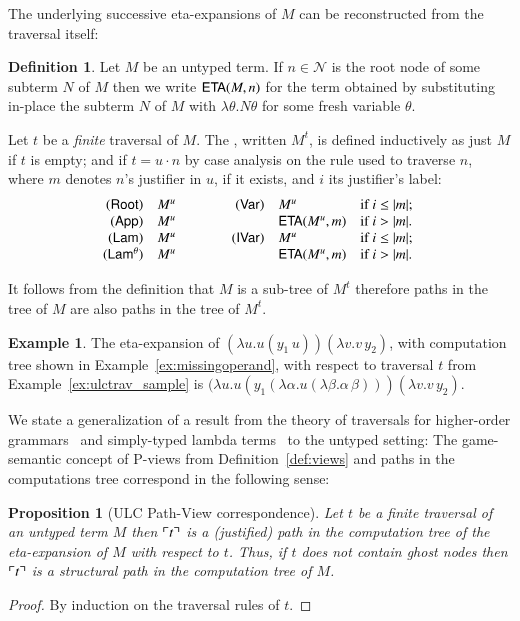 \documentclass{elsarticle}
\theoremstyle{plain}
\newtheorem{proposition}[theorem]{Proposition}
\theoremstyle{definition}
\newtheorem{definition}{Definition}[section]
\newtheorem{example}{Example}[section]
\theoremstyle{remark}
\newcommand\Nodes{\mathcal{N}}%
\newcommand{\ghostvar}{\theta}
\begin{document}
The underlying successive eta-expansions of $M$ can be reconstructed from the traversal itself:
\begin{definition}
\label{def:onthefly_etaexpansion}
Let $M$ be an untyped term. If $n\in \Nodes$ is the root node of some subterm $N$ of $M$ then we write ${\sf ETA}(M, n)$ for the term obtained by substituting in-place the subterm $N$ of $M$ with $\lambda\theta. N \theta$ for some fresh variable $\theta$.

Let $t$ be a \emph{finite} traversal of $M$. The , written $M^t$, is defined inductively as just $M$ if $t$ is empty; and if $t = u \cdot n$ by case analysis on the rule used to traverse $n$, where $m$ denotes $n$'s justifier in $u$, if it exists, and $i$ its justifier's label:
$$
\begin{array}{rlcrll}
    \rulename{Root}          & M^{u}  &\qquad & \rulename{Var}  & M^{u} \hfill &\mbox{if $i \leq |m|$; } \\
    \rulename{App}           & M^{u}  &       &                 & {\sf ETA}(M^{u}, m) \hfill  &\mbox{if $i > |m|$. } \\
    \rulename{Lam}           & M^{u}  &       & \rulename{IVar} & M^{u} \hfill &\mbox{if $i \leq |m|$; } \\
    \rulename{Lam^\ghostvar} & M^{u}  &       &                 & {\sf ETA}(M^{u}, m)  \hfill &\mbox{if $i > |m|$.}
\end{array}
$$
\end{definition}
It follows from the definition that $M$ is a sub-tree of $M^t$ therefore paths in the tree of $M$ are also paths in the tree of $M^t$.

\begin{example}
The eta-expansion of $(\lambda u . u(y_1\,u)) (\lambda v . v\,y_2)$, with computation tree shown in Example~\ref{ex:missingoperand}, with respect to traversal $t$ from Example~\ref{ex:ulctrav_sample} is
$(\lambda u . u(y_1 (\lambda \alpha. u (\lambda \beta.\alpha\,\beta))) (\lambda v . v\,y_2)$.
\end{example}

We state a generalization of a result from the theory of traversals for higher-order grammars~\cite{OngLics2006} and simply-typed lambda terms~\cite[Proposition 4.29]{BlumPhd} to the untyped setting: The game-semantic concept of P-views from Definition~\ref{def:views} and paths in the computations tree correspond in the following sense:

\begin{proposition}[ULC Path-View correspondence]
\label{prop:pathview_ulc}
Let $t$ be a \emph{finite} traversal of an untyped term $M$ then
 $\ulcorner t \urcorner$ is a (justified) path in the computation tree of the eta-expansion of $M$ with respect to $t$. Thus, if $t$ does not contain ghost nodes then $\ulcorner t \urcorner$ is a structural path in the computation tree of $M$.
\end{proposition}
\begin{proof}
By induction on the traversal rules of $t$.
\end{proof}
\end{document}
